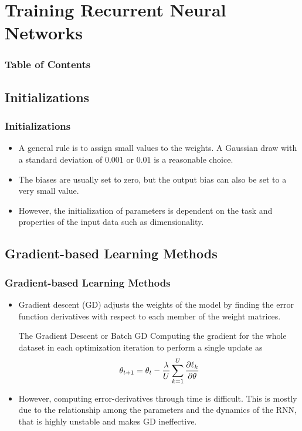 \documentclass[
	11pt,
]{beamer}
\begin{document}
\section{Training Recurrent Neural Networks}
\begin{frame}
	\frametitle{Table of Contents}
	\tableofcontents[currentsection]
\end{frame}

\subsection{Initializations}

\begin{frame}
	\frametitle{Initializations}

	\begin{itemize}
		\item A general rule is to assign small values to the weights. A
		Gaussian draw with a standard deviation of $0.001$ or $0.01$ is a reasonable choice.
		\bigskip
		\item The biases are usually set to zero,
		but the output bias can also be set to a very small value.
		\bigskip
		\item However, the initialization of parameters is dependent on the
		task and properties of the input data such as dimensionality. 
	\end{itemize}

\end{frame}


\subsection{Gradient-based Learning Methods}

\begin{frame}
	\frametitle{Gradient-based Learning Methods}
	\begin{itemize}
		\item Gradient descent (GD) adjusts the
weights of the model by finding the error function derivatives with respect to each member of the weight matrices.
	
 	\bigskip %
  
        \begin{block}{The Gradient Descent or Batch GD}
		Computing the gradient for the whole dataset in each optimization iteration to perform a single update as
		\begin{equation*}
            \theta_{t+1} = \theta_t - \frac{\lambda}{U}\sum_{k=1}^U \pdv{\ell_k}{\theta}
		\end{equation*}
	\end{block}
	
 	\bigskip %

	 \item However, computing error-derivatives through time is difficult. This is mostly due to the
	 relationship among the parameters and the dynamics of the RNN, that is highly unstable and makes GD ineffective.
	\end{itemize}
\end{frame}
\end{document}
